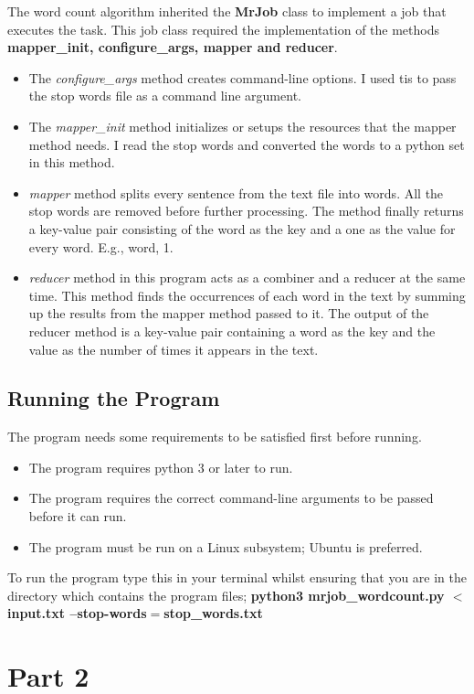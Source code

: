 \documentclass[12pt, a4paper, fleqn, titlepage]{article}
\begin{document}
        The word count algorithm inherited the \textbf{MrJob} class to implement a job that executes the task. This job class required the implementation of the methods \textbf{mapper\_init, configure\_args, mapper and reducer}. 
            \begin{itemize}
                \item The \emph{configure\_args} method creates command-line options. I used tis to pass the stop words file as a command line argument.
                \item The \emph{mapper\_init} method initializes or setups the resources that the mapper method needs. I read the stop words and converted the words to a python set in this method.
                \item \emph{mapper} method splits every sentence from the text file into words.
                All the stop words are removed before further processing. The method
                finally returns a key-value pair consisting of the word as the key and a one as the value for every word. E.g., word, 1.
                \item \emph{reducer} method in this program acts as a combiner and a reducer
                at the same time. This method finds the occurrences of each word in the
                text by summing up the results from the mapper method passed to it.
                The output of the reducer method is a key-value pair containing a word
                as the key and the value as the number of times it appears in the text.
            \end{itemize}
    \subsection*{Running the Program}
            The program needs some requirements to be satisfied first before running.
                \begin{itemize}
                    \item The program requires python 3 or later to run.
                    \item The program requires the correct command-line arguments to be passed before it can run.
                    \item The program must be run on a Linux subsystem; Ubuntu is preferred.
                \end{itemize}
            
            To run the program type this in your terminal whilst ensuring that you are in the directory which contains the program files;
            \textbf{python3 mrjob\_wordcount.py $<$input.txt --stop-words$=$stop\_words.txt}

\section*{Part 2}
\end{document}

